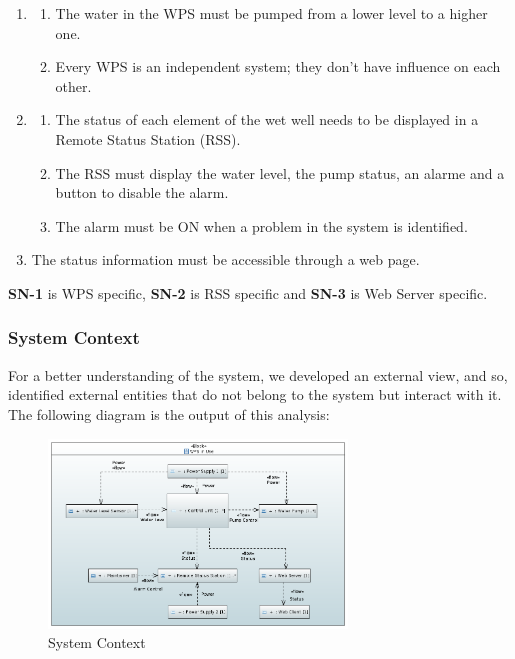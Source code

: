 \documentclass[11pt]{article}
\begin{document}
\begin{enumerate}[leftmargin=4em, font=\small, label=\textbf{SN-\arabic*}]
	\setlength\itemsep{.5em}
	\item 
		\begin{enumerate}[leftmargin=1.5em, font=\small, label=\textbf{.\arabic*:}]
		\setlength\itemsep{0em}	
		\item The water in the WPS must be pumped from a lower level to a higher one.
		\item Every WPS is an independent system; they don't have influence on each other.
		\end{enumerate}
	\item 
		\begin{enumerate}[leftmargin=1.5em, font=\small, label=\textbf{.\arabic*:}]
		\setlength\itemsep{0em}	
		\item The status of each element of the wet well needs to be displayed in a Remote Status Station (RSS). 
		\item The RSS must display the water level, the pump status, an alarme and a button to disable the alarm.
		\item The alarm must be ON when a problem in the system is identified.
		\end{enumerate}
		
	\item The status information must be accessible through a web page.
\end{enumerate}

\noindent
\textbf{SN-1} is WPS specific, \textbf{SN-2} is RSS specific and \textbf{SN-3} is Web Server specific.

\subsubsection{System Context}

For a better understanding of the system, we developed an external view, and so, identified external entities that do not belong to the system but interact with it. The following diagram is the output of this analysis:

\begin{figure}[H]
  \centering
  \includegraphics[width=300px]{../diagrams/system-context-01.png}
  \caption{System Context}
  \label{fig:System Context}
\end{figure}
\end{document}
